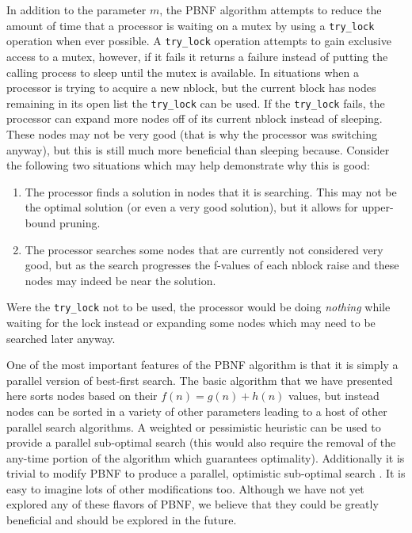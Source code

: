 \documentclass{article}
\begin{document}
In addition to the parameter $m$, the PBNF algorithm attempts to
reduce the amount of time that a processor is waiting on a mutex by
using a \texttt{try\_lock} operation when ever possible.  A
\texttt{try\_lock} operation attempts to gain exclusive access to a
mutex, however, if it fails it returns a failure instead of putting
the calling process to sleep until the mutex is available.  In
situations when a processor is trying to acquire a new nblock, but the
current block has nodes remaining in its open list the
\texttt{try\_lock} can be used.  If the \texttt{try\_lock} fails, the
processor can expand more nodes off of its current nblock instead of
sleeping.  These nodes may not be very good (that is why the processor
was switching anyway), but this is still much more beneficial than
sleeping because.  Consider the following two situations which may
help demonstrate why this is good:
\begin{enumerate}
\item The processor finds a solution in nodes that it is searching.
  This may not be the optimal solution (or even a very good solution),
  but it allows for upper-bound pruning.
\item The processor searches some nodes that are currently not
  considered very good, but as the search progresses the f-values of
  each nblock raise and these nodes may indeed be near the solution.
\end{enumerate}
Were the \texttt{try\_lock} not to be used, the processor would be
doing \emph{nothing} while waiting for the lock instead or expanding
some nodes which may need to be searched later anyway.

One of the most important features of the PBNF algorithm is that it is
simply a parallel version of best-first search.  The basic algorithm
that we have presented here sorts nodes based on their $f(n) = g(n) +
h(n)$ values, but instead nodes can be sorted in a variety of other
parameters leading to a host of other parallel search algorithms.  A
weighted or pessimistic heuristic can be used to provide a parallel
sub-optimal search (this would also require the removal of the
any-time portion of the algorithm which guarantees optimality).
Additionally it is trivial to modify PBNF to produce a parallel,
optimistic sub-optimal search \cite{thayer:fas}.  It is easy to
imagine lots of other modifications too.  Although we have not yet
explored any of these flavors of PBNF, we believe that they could be
greatly beneficial and should be explored in the future.
\end{document}
